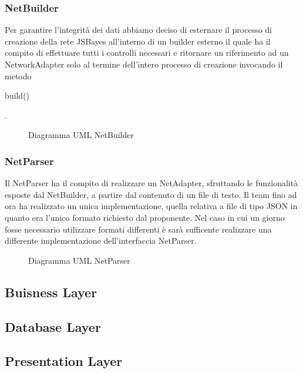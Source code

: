 \subsubsection{NetBuilder}
Per garantire l'integrità dei dati abbiamo deciso di esternare il processo di creazione della rete JSBayes all'interno di un builder esterno il quale ha il compito di effettuare tutti i controlli necessari e ritornare un riferimento ad un NetworkAdapter solo al termine dell'intero processo di creazione invocando il metodo
\begin{ttfamily}
	build()
\end{ttfamily}.
\begin{figure} [H]
	\centering
	
	\caption{Diagramma UML NetBuilder}\label{}
\end{figure}
\subsubsection{NetParser}
Il NetParser ha il compito di realizzare un NetAdapter, sfruttando le funzionalità esposte dal NetBuilder, a partire dal contenuto di un file di testo.
Il team fino ad ora ha realizzato un unica implementazione, quella relativa a file di tipo JSON in quanto era l'unico formato richiesto dal proponente.
Nel caso in cui un giorno fosse necessario utilizzare formati differenti è sarà sufficente realizzare una differente implementazione dell'interfaccia NetParser.
\begin{figure} [H]
	\centering
	
	\caption{Diagramma UML NetParser}\label{}
\end{figure}
\subsection{Buisness Layer}
\subsection{Database Layer}
\subsection{Presentation Layer}
\pagebreak